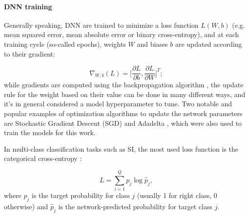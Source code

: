 \paragraph{DNN training}
Generally speaking, DNN are trained to minimize a loss function $L(W, b)$ (e.g. mean squared error, mean absolute error or binary cross-entropy), and at each training cycle (so-called epochs), weights $W$ and biases $b$ are updated according to their gradient:

$$\nabla_{W, b}(L) = \Big[\frac{\partial L}{\partial b}, \frac{\partial L}{\partial W}\Big]^T \text{; }$$
while gradients are computed using the backpropagation algorithm \cite{backprogation}, the update rule for the weight based on their value can be done in many different ways, and it's in general considered a model hyperparameter to tune. Two notable and popular examples of optimization algorithms to update the network parameters are Stochastic Gradient Descent (SGD) \cite{sgd} and Adadelta \cite{adadelta}, which were also used to train the models for this work.

In multi-class classification tasks such as SI, the most used loss function is the categorical cross-entropy \cite{si:dnnhmm}:

$$L = \sum_{i=1}^{Q} p_j \log \hat{p}_j \text{, }$$
where $p_j$ is the target probability for class $j$ (usually 1 for right class, 0 otherwise) and $\hat{p}_j$ is the network-predicted probability for target class $j$.









